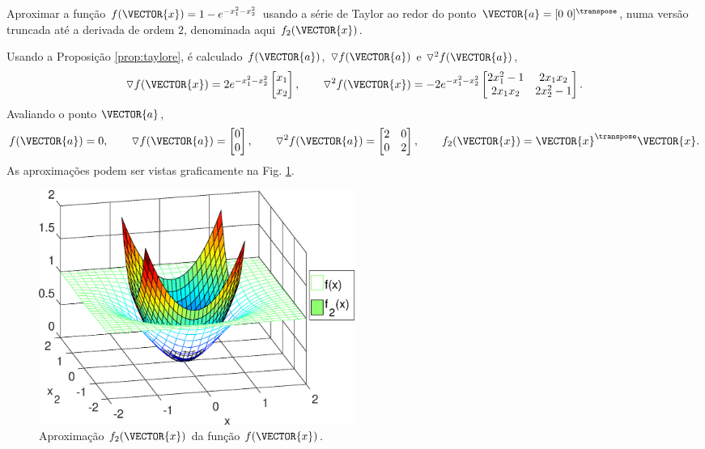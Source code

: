 \begin{example}
Aproximar a função $f(\VECTOR{x})=1-e^{-x_1^2-x_2^2}$ usando a 
série de Taylor ao redor do ponto $\VECTOR{a}=[0~ 0]^{\transpose}$,
numa versão truncada até a derivada de ordem $2$,
denominada aqui $f_2(\VECTOR{x})$.
\end{example}
\begin{SolutionT}
Usando a Proposição \ref{prop:taylore}, é calculado $f(\VECTOR{a})$, 
$\triangledown f(\VECTOR{a})$ e $\triangledown^2 f(\VECTOR{a})$,
\begin{equation}
\triangledown f(\VECTOR{x}) = 
2 e^{-x_1^2-x_2^2}
\begin{bmatrix}
x_1 \\
x_2
\end{bmatrix},
\qquad 
\triangledown^2 f(\VECTOR{x}) = 
-2 e^{-x_1^2-x_2^2}
\begin{bmatrix}
2 x_1^2-1 & 2 x_1 x_2\\
2 x_1 x_2 & 2 x_2^2-1
\end{bmatrix}.
\end{equation}
Avaliando o ponto $\VECTOR{a}$,
\begin{equation}
f(\VECTOR{a})=0,
\qquad 
\triangledown f(\VECTOR{a}) = 
\begin{bmatrix}
0 \\
0
\end{bmatrix},
\qquad 
\triangledown^2 f(\VECTOR{a}) = 
\begin{bmatrix}
2 & 0\\
0 & 2
\end{bmatrix},
\qquad 
f_2(\VECTOR{x}) = 
\VECTOR{x}^{\transpose}\VECTOR{x}.
\end{equation}
As aproximações podem ser vistas graficamente na Fig. \ref{fig:taylorf}.
\end{SolutionT}


\begin{figure}[!h]
  \centering
    \includegraphics[width=0.5\textwidth]{chapters/funcoes/mcode/taylorR2R1/taylorf.eps}
  \caption{Aproximação $f_2(\VECTOR{x})$ da função $f(\VECTOR{x})$.}
    \label{fig:taylorf}
\end{figure}
 
